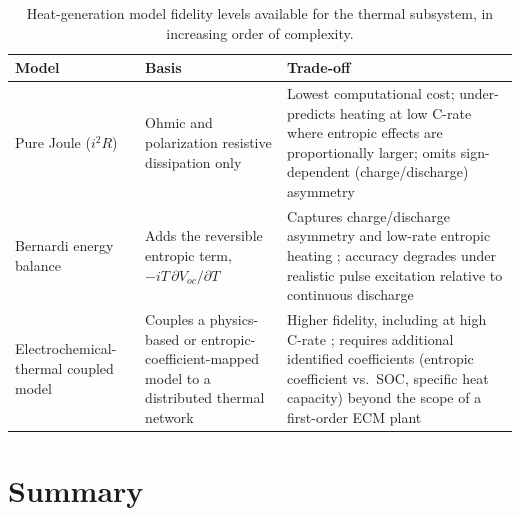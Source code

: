 \begin{table}[htbp]
\centering
\caption{Heat-generation model fidelity levels available for the thermal subsystem, in increasing order of complexity.}
\label{tab:10_thermal_fidelity}
\begin{tabular}{p{2.6cm}p{4.6cm}p{4.6cm}}
\toprule
\textbf{Model} & \textbf{Basis} & \textbf{Trade-off} \\
\midrule
Pure Joule ($i^2 R$) & Ohmic and polarization resistive dissipation only & Lowest computational cost; under-predicts heating at low C-rate where entropic effects are proportionally larger; omits sign-dependent (charge/discharge) asymmetry \\
Bernardi energy balance & Adds the reversible entropic term, $-iT\,\partial V_{oc}/\partial T$ & Captures charge/discharge asymmetry and low-rate entropic heating \cite{bernardi1985}; accuracy degrades under realistic pulse excitation relative to continuous discharge \cite{bernardi_pulse_accuracy} \\
Electrochemical-thermal coupled model & Couples a physics-based or entropic-coefficient-mapped model to a distributed thermal network & Higher fidelity, including at high C-rate \cite{chun2024_entropic}; requires additional identified coefficients (entropic coefficient vs.\ SOC, specific heat capacity) beyond the scope of a first-order ECM plant \\
\bottomrule
\end{tabular}
\end{table}

\section{Summary}
\label{sec:10_4}

